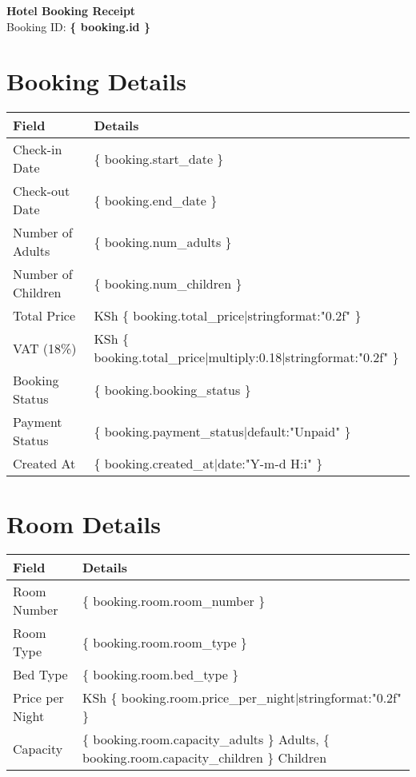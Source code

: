 \documentclass[a4paper,12pt]{article}
\begin{document}
\begin{center}
    \textbf{\Large Hotel Booking Receipt} \\
    \vspace{0.5cm}
    Booking ID: \textbf{\{{ booking.id }\}}
\end{center}

\section*{Booking Details}
\begin{tabular}{ll}
    \toprule
    \textbf{Field} & \textbf{Details} \\
    \midrule
    Check-in Date & \{{ booking.start_date }\} \\
    Check-out Date & \{{ booking.end_date }\} \\
    Number of Adults & \{{ booking.num_adults }\} \\
    Number of Children & \{{ booking.num_children }\} \\
    Total Price & KSh \{{ booking.total_price|stringformat:"0.2f" }\} \\
    VAT (18\%) & KSh \{{ booking.total_price|multiply:0.18|stringformat:"0.2f" }\} \\
    Booking Status & \{{ booking.booking_status }\} \\
    Payment Status & \{{ booking.payment_status|default:"Unpaid" }\} \\
    Created At & \{{ booking.created_at|date:"Y-m-d H:i" }\} \\
    \bottomrule
\end{tabular}

\section*{Room Details}
\begin{tabular}{ll}
    \toprule
    \textbf{Field} & \textbf{Details} \\
    \midrule
    Room Number & \{{ booking.room.room_number }\} \\
    Room Type & \{{ booking.room.room_type }\} \\
    Bed Type & \{{ booking.room.bed_type }\} \\
    Price per Night & KSh \{{ booking.room.price_per_night|stringformat:"0.2f" }\} \\
    Capacity & \{{ booking.room.capacity_adults }\} Adults, \{{ booking.room.capacity_children }\} Children \\
    \bottomrule
\end{tabular}
\end{document}
